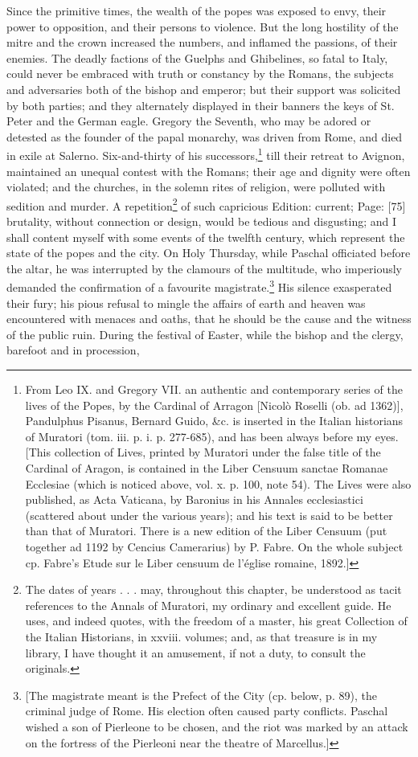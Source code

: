 Since the primitive times, the wealth of the popes was exposed to envy, their power to opposition, and their persons to violence. But the long hostility of the mitre and the crown increased the numbers, and inflamed the passions, of their enemies. The deadly factions of the Guelphs and Ghibelines, so fatal to Italy, could never be embraced with truth or constancy by the Romans, the subjects and adversaries both of the bishop and emperor; but their support was solicited by both parties; and they alternately displayed in their banners the keys of St. Peter and the German eagle. Gregory the Seventh, who may be adored or detested as the founder of the papal monarchy, was driven from Rome, and died in exile at Salerno. Six-and-thirty of his successors,\footnote{From Leo IX. and Gregory VII. an authentic and contemporary series of the lives of the Popes, by the Cardinal of Arragon [Nicolò Roselli (ob. ad 1362)], Pandulphus Pisanus, Bernard Guido, \&c. is inserted in the Italian historians of Muratori (tom. iii. p. i. p. 277-685), and has been always before my eyes. [This collection of Lives, printed by Muratori under the false title of the Cardinal of Aragon, is contained in the Liber Censuum sanctae Romanae Ecclesiae (which is noticed above, vol. x. p. 100, note 54). The Lives were also published, as Acta Vaticana, by Baronius in his Annales ecclesiastici (scattered about under the various years); and his text is said to be better than that of Muratori. There is a new edition of the Liber Censuum (put together ad 1192 by Cencius Camerarius) by P. Fabre. On the whole subject cp. Fabre\texthebrew{}’s Etude sur le Liber censuum de l\texthebrew{}’église romaine, 1892.]} till their retreat to Avignon, maintained an unequal contest with the Romans; their age and dignity were often violated; and the churches, in the solemn rites of religion, were polluted with sedition and murder. A repetition\footnote{The dates of years . . . may, throughout this chapter, be understood as tacit references to the Annals of Muratori, my ordinary and excellent guide. He uses, and indeed quotes, with the freedom of a master, his great Collection of the Italian Historians, in xxviii. volumes; and, as that treasure is in my library, I have thought it an amusement, if not a duty, to consult the originals.} of such capricious Edition: current; Page: [75] brutality, without connection or design, would be tedious and disgusting; and I shall content myself with some events of the twelfth century, which represent the state of the popes and the city. On Holy Thursday, while Paschal officiated before the altar, he was interrupted by the clamours of the multitude, who imperiously demanded the confirmation of a favourite magistrate.\footnote{[The magistrate meant is the Prefect of the City (cp. below, p. 89), the criminal judge of Rome. His election often caused party conflicts. Paschal wished a son of Pierleone to be chosen, and the riot was marked by an attack on the fortress of the Pierleoni near the theatre of Marcellus.]} His silence exasperated their fury; his pious refusal to mingle the affairs of earth and heaven was encountered with menaces and oaths, that he should be the cause and the witness of the public ruin. During the festival of Easter, while the bishop and the clergy, barefoot and in procession, 